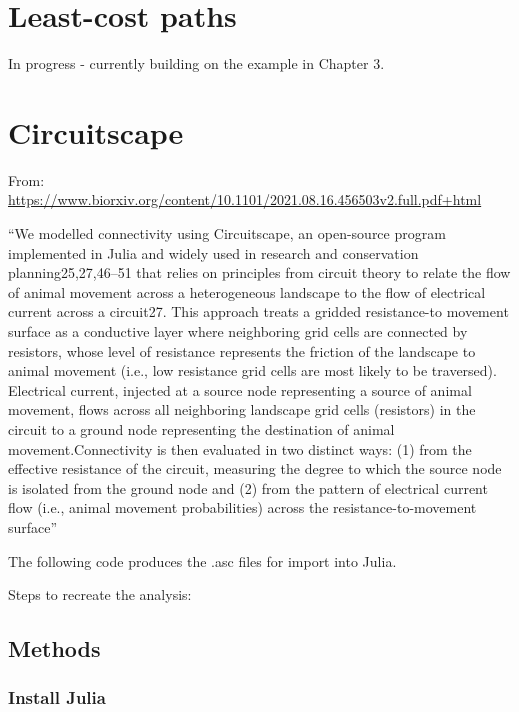 \documentclass[
]{book}
\begin{document}
\hypertarget{least-cost-paths}{%
\chapter{Least-cost paths}\label{least-cost-paths}}

In progress - currently building on the example in Chapter 3.

\hypertarget{circuitscape}{%
\chapter{Circuitscape}\label{circuitscape}}

From: \url{https://www.biorxiv.org/content/10.1101/2021.08.16.456503v2.full.pdf+html}

``We modelled connectivity using Circuitscape, an open-source program implemented in
Julia and widely used in research and conservation planning25,27,46--51 that relies on principles
from circuit theory to relate the flow of animal movement across a heterogeneous landscape to
the flow of electrical current across a circuit27. This approach treats a gridded resistance-to
movement surface as a conductive layer where neighboring grid cells are connected by resistors,
whose level of resistance represents the friction of the landscape to animal movement (i.e., low
resistance grid cells are most likely to be traversed). Electrical current, injected at a source node representing a source of animal movement, flows across all neighboring landscape grid cells
(resistors) in the circuit to a ground node representing the destination of animal movement.Connectivity is then evaluated in two distinct ways: (1) from the effective resistance of the circuit, measuring the degree to which the source node is isolated from the ground node and (2) from the pattern of electrical current flow (i.e., animal movement probabilities) across the
resistance-to-movement surface''

The following code produces the .asc files for import into Julia.

Steps to recreate the analysis:

\hypertarget{methods-1}{%
\section{Methods}\label{methods-1}}

\hypertarget{install-julia}{%
\subsection{Install Julia}\label{install-julia}}
\end{document}
